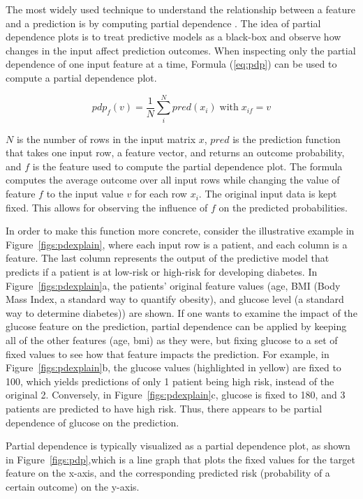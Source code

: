 


The most widely used technique to understand the relationship between a feature and a prediction is by computing partial dependence \cite{friedman2001,hastie2001}.
The idea of partial dependence plots is to treat predictive models as a black-box and observe how changes in the input affect prediction outcomes.
When inspecting only the partial dependence of one input feature at a time, Formula (\ref{eq:pdp}) can be used to compute a partial dependence plot.

\begin{equation}
pdp_f(v) = \frac{1}{N} \sum_i^N pred(x_i) \;\text{with}\; x_{if} = v
\label{eq:pdp}
\end{equation}

$N$ is the number of rows in the input matrix $x$,
$pred$ is the prediction function that takes one input row, a feature vector, and returns an outcome probability,
and $f$ is the feature used to compute the partial dependence plot.
The formula computes the average outcome over all input rows while changing the value of feature $f$ to the
input value $v$ for each row $x_i$. The original input data is kept fixed. This allows for observing the influence of $f$
on the predicted probabilities.

In order to make this function more concrete, consider the illustrative example in Figure~\ref{figs:pdexplain}, where each input row is a patient, and each column is a feature.  The last column represents the output of the predictive model that predicts if a patient is at low-risk or high-risk for developing diabetes.  In Figure~\ref{figs:pdexplain}a, the patients' original feature values (age, BMI (Body Mass Index, a standard way to quantify obesity), and glucose level (a standard way to determine diabetes)) are shown.  If one wants to examine the impact of the glucose feature on the prediction, partial dependence can be applied by keeping all of the other features (age, bmi) as they were, but fixing glucose to a set of fixed values to see how that feature impacts the prediction.  For example, in Figure~\ref{figs:pdexplain}b, the glucose values (highlighted in yellow) are fixed to 100, which yields predictions of only 1 patient being high risk, instead of the original 2.  Conversely, in Figure~\ref{figs:pdexplain}c, glucose is fixed to 180, and 3 patients are predicted to have high risk.  Thus, there appears to be partial dependence of glucose on the prediction.  

Partial dependence is typically visualized as a partial dependence plot, as shown in Figure~\ref{figs:pdp},which is a line graph that plots the fixed values for the target feature on the x-axis, and the corresponding predicted risk (probability of a certain outcome) on the y-axis.  
